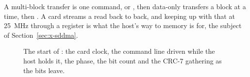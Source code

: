 A multi-block transfer is one command,  or ,
then data-only transfers a block at a time, then . A card
streams a read back to back, and keeping up with that at 25~MHz
through a register is what the host's way to memory is for, the
subject of Section~\ref{sec:x-sddma}.

\begin{figure}[htbp]
\centering

\caption{The start of : the card clock, the command line
driven while the host holds it, the phase, the bit count and the
CRC-7 gathering as the bits leave.}
\label{fig:x-sd}
\end{figure}




